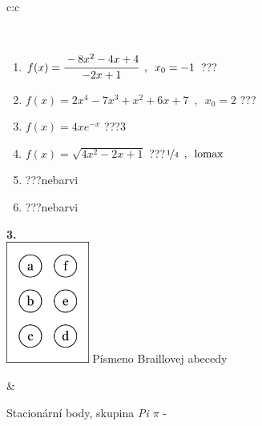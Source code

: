 \documentclass[10pt]{report}
\begin{document}
\begin{tabular}{c:c}
\begin{minipage}[c][104.5mm][t]{0.5\linewidth}
\begin{center}
\begin{minipage}{0.95\linewidth}
\begin{center}
\end{center}
\end{minipage}
\\[1mm]
\begin{minipage}{0.79\linewidth}
\begin{center}
\begin{varwidth}{\linewidth}
\begin{enumerate}
\normalsize
\item $f(x)=\cfrac{-8x^2-4x+4}{-2x+1}\enspace , \enspace x_0=-1$\quad \dotfill\; ???\;\dotfill \quad {}
\item $f(x)=2x^4-7x^3+x^2+6x+7\enspace , \enspace x_0=2$\quad \dotfill\; ???\;\dotfill \quad {}
\item $f(x)=4xe^{-x}$\quad \dotfill\; ???\;\dotfill \quad $3$
\item $f(x)=\sqrt{4x^2-2x+1}$\quad \dotfill\; ???\;\dotfill \quad $\nicefrac{1}{4}\enspace , \enspace\mathrm{lomax}$
\item \quad \dotfill\; ???\;\dotfill \quad nebarvi
\item \quad \dotfill\; ???\;\dotfill \quad nebarvi
\end{enumerate}
\end{varwidth}
\end{center}
\end{minipage}
\begin{minipage}{0.20\linewidth}
\begin{center}
{\Huge\bfseries 3.} \\[2mm]
\includegraphics[height=40mm]{../images/braille.png}
{\small Písmeno Braillovej abecedy}
\end{center}
\end{minipage}
\end{center}
\end{minipage}
&
\begin{minipage}[c][104.5mm][t]{0.5\linewidth}
\begin{center}
\vspace{7mm}
{\huge Stacionární body, skupina \textit{Pi $\pi$} -}\\[5mm]

\end{center}
\end{minipage}
\end{tabular}
\end{document}
